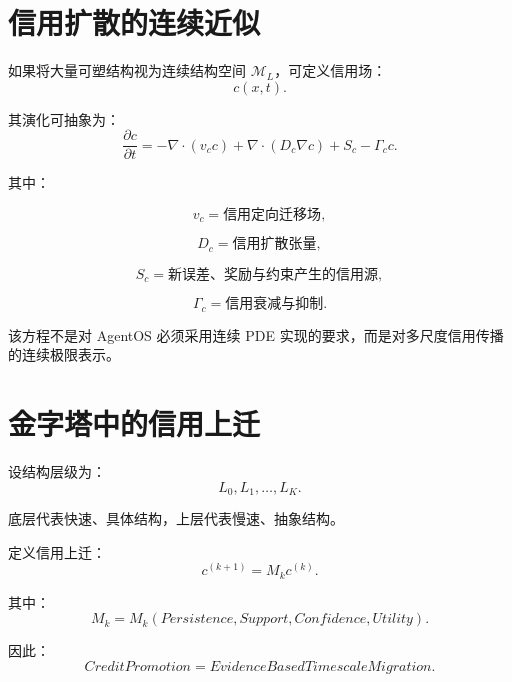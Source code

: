 \section{信用扩散的连续近似}

如果将大量可塑结构视为连续结构空间 $\mathcal{M}_L$，可定义信用场：
\begin{equation}
c(x,t).
\end{equation}

其演化可抽象为：
\begin{equation}
\boxed{
\frac{\partial c}{\partial t}
=
-\nabla\cdot
(
v_c c
)
+
\nabla\cdot
(
D_c\nabla c
)
+
S_c
-
\Gamma_c c.
}
\end{equation}

其中：

\begin{equation}
v_c
=
\text{信用定向迁移场},
\end{equation}

\begin{equation}
D_c
=
\text{信用扩散张量},
\end{equation}

\begin{equation}
S_c
=
\text{新误差、奖励与约束产生的信用源},
\end{equation}

\begin{equation}
\Gamma_c
=
\text{信用衰减与抑制}.
\end{equation}

该方程不是对 AgentOS 必须采用连续 PDE 实现的要求，而是对多尺度信用传播的连续极限表示。


\section{金字塔中的信用上迁}

设结构层级为：
\begin{equation}
L_0,L_1,\ldots,L_K.
\end{equation}

底层代表快速、具体结构，上层代表慢速、抽象结构。

定义信用上迁：
\begin{equation}
c^{(k+1)}
=
M_k
c^{(k)}.
\end{equation}

其中：
\begin{equation}
M_k
=
M_k(
Persistence,
Support,
Confidence,
Utility
).
\end{equation}

因此：
\begin{equation}
\boxed{
CreditPromotion
=
EvidenceBasedTimescaleMigration.
}
\end{equation}

